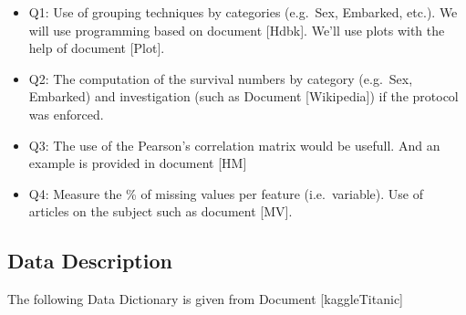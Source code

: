 \documentclass[11pt]{article}
\begin{document}
\begin{itemize}
\item
  Q1: Use of grouping techniques by categories (e.g.~Sex, Embarked,
  etc.). We will use programming based on document {[}Hdbk{]}. We'll use
  plots with the help of document {[}Plot{]}.
\item
  Q2: The computation of the survival numbers by category (e.g.~Sex,
  Embarked) and investigation (such as Document {[}Wikipedia{]}) if the
  protocol was enforced.
\item
  Q3: The use of the Pearson's correlation matrix would be usefull. And
  an example is provided in document {[}HM{]}
\item
  Q4: Measure the \% of missing values per feature (i.e.~variable). Use
  of articles on the subject such as document {[}MV{]}.
\end{itemize}

    \subsection{Data Description}\label{data-description}

The following Data Dictionary is given from Document {[}kaggleTitanic{]}
\end{document}
